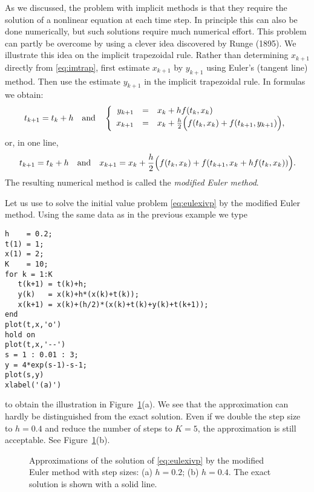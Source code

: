 \documentclass{ximera}
\begin{document}
As we discussed, the problem with implicit methods is that they require
the solution of a nonlinear equation at each time step.  In principle
this can also be done numerically, but such solutions 
require much numerical effort.  This problem can partly be overcome by 
using a clever idea discovered by {\sc Runge} (1895).  We illustrate 
this idea on the implicit trapezoidal rule.  Rather than determining 
$x_{k+1}$ directly from \eqref{eq:imtrap}, first estimate 
$x_{k+1}$ by $y_{k+1}$ using Euler's 
(tangent line) method.  Then use the estimate $y_{k+1}$ in the implicit 
trapezoidal rule.
In formulas we obtain:
\[
t_{k+1} = t_k+h \quad\mbox{and}\quad
\left\{\begin{array}{rcl}
y_{k+1} & = & x_k + h f(t_k, x_k)\\
x_{k+1} & = & x_k + \frac{h}{2}
\Big( f(t_k, x_k)+f(t_{k+1}, y_{k+1})\Big),
\end{array}\right.
\]
or, in one line,
\begin{equation}
\label{eq:meulmethod}
t_{k+1} = t_k+h \quad\mbox{and}\quad
x_{k+1} = x_k + \frac{h}{2}
\Big( f(t_k, x_k)+f(t_{k+1}, x_k + h f(t_k, x_k))\Big).
\end{equation}
The resulting numerical method is called the {\em modified Euler method}.
 

Let us use \Matlab to solve the initial value problem
\eqref{eq:eulexivp} by the modified Euler method.  
Using the same data as in the previous example we type
\begin{verbatim}
h    = 0.2;
t(1) = 1;
x(1) = 2;
K    = 10;
for k = 1:K
   t(k+1) = t(k)+h;
   y(k)   = x(k)+h*(x(k)+t(k));
   x(k+1) = x(k)+(h/2)*(x(k)+t(k)+y(k)+t(k+1));
end
plot(t,x,'o')
hold on
plot(t,x,'--')
s = 1 : 0.01 : 3;
y = 4*exp(s-1)-s-1;
plot(s,y)
xlabel('(a)')
\end{verbatim}
to obtain the illustration in Figure~\ref{fig:mEul}(a).
We see that the approximation can hardly be distinguished from
the exact solution.  Even if we double the step size 
to $h=0.4$ and reduce the number of steps to $K=5$, the 
approximation is still acceptable.  See Figure~\ref{fig:mEul}(b).

\begin{figure}[htb]
   \centerline{%
   }
   \caption{Approximations of the solution of
   \protect\eqref{eq:eulexivp} by the modified Euler method
   with step sizes: (a) $h=0.2$; (b) $h=0.4$.
   The exact solution is shown with a solid line.}
   \label{fig:mEul}
\end{figure}
\end{document}
